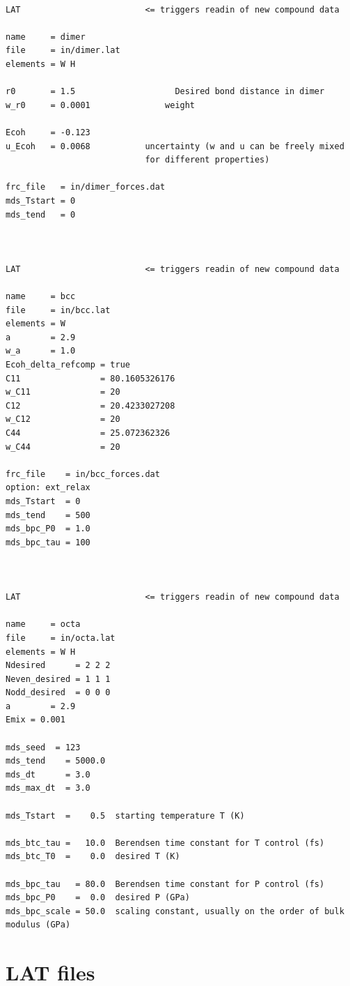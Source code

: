 \documentclass[a4paper,12pt,pdftex,onecolumn]{article}
\begin{document}
\begin{Verbatim}[fontsize=\relsize{-1},frame=single]

LAT                         <= triggers readin of new compound data

name     = dimer
file     = in/dimer.lat
elements = W H

r0       = 1.5                    Desired bond distance in dimer
w_r0     = 0.0001               weight

Ecoh     = -0.123
u_Ecoh   = 0.0068           uncertainty (w and u can be freely mixed
                            for different properties)

frc_file   = in/dimer_forces.dat
mds_Tstart = 0
mds_tend   = 0



LAT                         <= triggers readin of new compound data

name     = bcc
file     = in/bcc.lat
elements = W
a        = 2.9
w_a      = 1.0
Ecoh_delta_refcomp = true
C11                = 80.1605326176
w_C11              = 20
C12                = 20.4233027208
w_C12              = 20
C44                = 25.072362326
w_C44              = 20

frc_file    = in/bcc_forces.dat
option: ext_relax
mds_Tstart  = 0
mds_tend    = 500
mds_bpc_P0  = 1.0
mds_bpc_tau = 100



LAT                         <= triggers readin of new compound data

name     = octa
file     = in/octa.lat
elements = W H
Ndesired      = 2 2 2
Neven_desired = 1 1 1
Nodd_desired  = 0 0 0
a        = 2.9
Emix = 0.001

mds_seed  = 123
mds_tend    = 5000.0
mds_dt      = 3.0
mds_max_dt  = 3.0

mds_Tstart  =    0.5  starting temperature T (K)

mds_btc_tau =   10.0  Berendsen time constant for T control (fs)
mds_btc_T0  =    0.0  desired T (K)

mds_bpc_tau   = 80.0  Berendsen time constant for P control (fs)
mds_bpc_P0    =  0.0  desired P (GPa)
mds_bpc_scale = 50.0  scaling constant, usually on the order of bulk modulus (GPa)

\end{Verbatim}




\section{LAT files}
\end{document}
